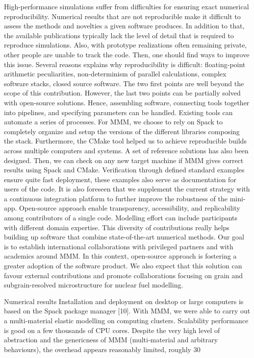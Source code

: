 High-performance simulations suffer from difficulties for ensuring exact numerical reproducibility. Numerical results that are not reproducible make it difficult to assess the methods and novelties a given software produces. In addition to that, the available publications typically lack the level of detail that is required to reproduce simulations. Also, with prototype realizations often remaining private, other people are unable to track the code. Then, one should find ways to improve this issue. Several reasons explains why reproducibility is difficult: floating-point arithmetic peculiarities, non-determinism of parallel calculations, complex software stacks, closed source software. The two first points are well beyond the scope of this contribution. However, the last two points can be partially solved with open-source solutions. Hence, assembling software, connecting tools together into pipelines, and specifying parameters can be handled. Existing tools can automate a series of processes. For MMM, we choose to rely on Spack to completely organize and setup the versions of the different libraries composing the stack. Furthermore, the CMake tool helped us to achieve reproducible builds across multiple computers and systems. A set of reference solutions has also been designed. Then, we can check on any new target machine if MMM gives correct results using Spack and CMake. Verification through defined standard examples ensure quite fast deployment, these examples also serve as documentation for users of the code. It is also foreseen that we supplement the current strategy with a continuous integration platform to further improve the robustness of the mini-app.
Open-source approach enable transparency, accessibility, and replicability among contributors of a single code. Modelling effort can include participants with different domain expertise. This diversity of contributions really helps building up software that combine state-of-the-art numerical methods.  Our goal is to establish international collaborations with privileged partners and with academics around MMM. In this context, open-source approach is fostering a greater adoption of the software product. We also expect that this solution can favour external contributions and promote collaborations focusing on grain and subgrain-resolved microstructure for nuclear fuel modelling.

Numerical results
Installation and deployment on desktop or large computers is based on the Spack package manager [10]. With MMM, we were able to carry out a multi-material elastic modelling on computing clusters. Scalability performance is good on a few thousands of CPU cores. Despite the very high level of abstraction and the genericness of MMM (multi-material and arbitrary behaviours), the overhead appears reasonably limited, roughly 30%


